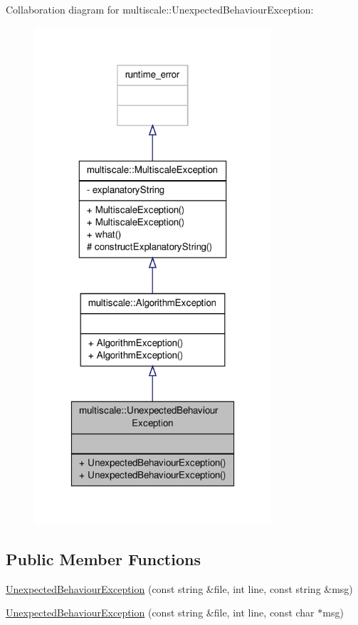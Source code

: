 Collaboration diagram for multiscale\-:\-:Unexpected\-Behaviour\-Exception\-:
\nopagebreak
\begin{figure}[H]
\begin{center}
\leavevmode
\includegraphics[width=250pt]{classmultiscale_1_1UnexpectedBehaviourException__coll__graph}
\end{center}
\end{figure}
\subsection*{Public Member Functions}
\begin{DoxyCompactItemize}
\item 
\hyperlink{classmultiscale_1_1UnexpectedBehaviourException_a99903f4c6c5f1746cb15f0ccf2c1233b}{Unexpected\-Behaviour\-Exception} (const string \&file, int line, const string \&msg)
\item 
\hyperlink{classmultiscale_1_1UnexpectedBehaviourException_adc0d1294e28ffd3eed251a60832d43bc}{Unexpected\-Behaviour\-Exception} (const string \&file, int line, const char $\ast$msg)
\end{DoxyCompactItemize}
